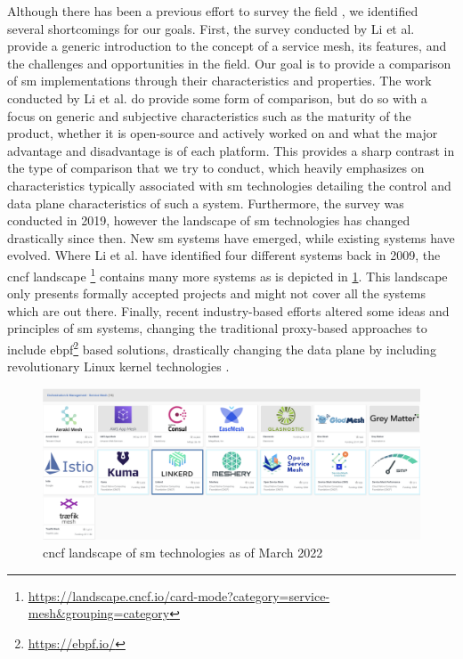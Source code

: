 Although there has been a previous effort to survey the field \cite{service-mesh-survey}, we identified several shortcomings for our goals. First, the survey conducted by Li et al. provide a generic introduction to the concept of a service mesh, its features, and the challenges and opportunities in the field. Our goal is to provide a comparison of \gls{sm} implementations through their characteristics and properties. The work conducted by Li et al. do provide some form of comparison, but do so with a focus on generic and subjective characteristics such as the maturity of the product, whether it is open-source and actively worked on and what the major advantage and disadvantage is of each platform. This provides a sharp contrast in the type of comparison that we try to conduct, which heavily emphasizes on characteristics typically associated with  \gls{sm} technologies detailing the control and data plane characteristics of such a system. Furthermore, the survey was conducted in 2019, however the landscape of \gls{sm} technologies has changed drastically since then. New \gls{sm} systems have emerged, while existing systems have evolved. Where Li et al. \cite{service-mesh-survey} have identified four different systems back in 2009, the \gls{cncf} landscape \cite{cncf-landscape}\footnote{\url{https://landscape.cncf.io/card-mode?category=service-mesh&grouping=category}} contains many more systems as is depicted in \cref{fig:cncf-landscape-sm}. This landscape only presents formally accepted projects and might not cover all the systems which are out there. Finally, recent industry-based efforts altered some ideas and principles of \gls{sm} systems, changing the traditional proxy-based approaches to include  \gls{ebpf}\footnote{\url{https://ebpf.io/}} based solutions, drastically changing the data plane by including revolutionary Linux kernel technologies \cite{istio-merbridge, cilium-mesh}.


\begin{figure}[t]
    \centering
    \includegraphics[width=0.9\linewidth]{3_systems_survey/figures/cncf-landscape-service-mesh}
    \caption{\gls{cncf} landscape of \gls{sm} technologies as of March 2022}
    \label{fig:cncf-landscape-sm}
\end{figure}

